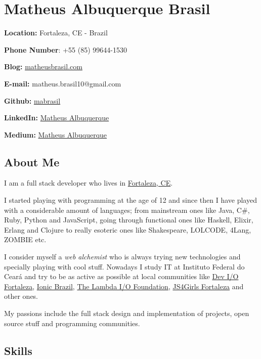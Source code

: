 \documentclass[]{article}
\date{}
\begin{document}
\section{Matheus Albuquerque Brasil}\label{matheus-albuquerque-brasil}

\textbf{Location:} Fortaleza, CE - Brazil

\textbf{Phone Number}: +55 (85) 99644-1530

\textbf{Blog:} \href{http://matheusbrasil.com}{matheusbrasil.com}

\textbf{E-mail:} matheus.brasil10@gmail.com

\textbf{Github:} \href{https://github.com/mabrasil}{mabrasil}

\textbf{LinkedIn:}
\href{https://www.linkedin.com/in/matheusalbuquerque}{Matheus
Albuquerque}

\textbf{Medium:} \href{https://medium.com/@matheusalbuquerque}{Matheus
Albuquerque}

\subsection{About Me}\label{about-me}

I am a full stack developer who lives in
\href{http://pt.wikipedia.org/wiki/Fortaleza}{Fortaleza, CE}.

I started playing with programming at the age of 12 and since then I
have played with a considerable amount of languages; from mainstream
ones like Java, C\#, Ruby, Python and JavaScript, going through
functional ones like Haskell, Elixir, Erlang and Clojure to really
esoteric ones like Shakespeare, LOLCODE, 4Lang, ZOMBIE etc.

I consider myself a \emph{web alchemist} who is always trying new
technologies and specially playing with cool stuff. Nowadays I study IT
at Instituto Federal do Ceará and try to be as active as possible at
local communities like
\href{https://www.facebook.com/groups/fortalezadevelopers/}{Dev I/O
Fortaleza}, \href{http://ionicbrazil.com/}{Ionic Brazil},
\href{https://github.com/lambda-io}{The Lambda I/O Foundation},
\href{http://js4girls-fortaleza.github.io/}{JS4Girls Fortaleza} and
other ones.

My passions include the full stack design and implementation of
projects, open source stuff and programming communities.

\subsection{Skills}\label{skills}
\end{document}
